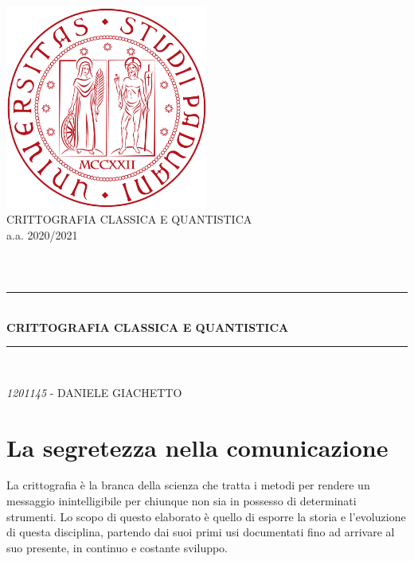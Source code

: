 \documentclass[a4paper, 12pt]{article}
\newcommand{\TITLE}{CRITTOGRAFIA CLASSICA E QUANTISTICA}
\begin{document}
\begin{titlepage}
\begin{center}
\includegraphics[width=0.5\textwidth]{unipd.png}\\

{\large \TITLE{} \\ a.a. 2020/2021}\\[0.5cm]

\begin{tabular}{ll}

\end{tabular}
\\[1.cm]

\rule{\linewidth}{0.5mm} \\[0.4cm]
{ \huge \bfseries \TITLE{} \\[0.4cm] } %

\rule{\linewidth}{0.5mm} \\[1.cm]
\noindent

\vfill
{\large \textit{1201145} - DANIELE GIACHETTO} %
\end{center}
\end{titlepage}

\tableofcontents %
\clearpage %

\pagestyle{fancy}
\section{La segretezza nella comunicazione}
La crittografia è la branca della scienza che tratta i metodi per rendere un messaggio inintelligibile per chiunque non sia in possesso di determinati strumenti.\newline
Lo scopo di questo elaborato è quello di esporre la storia e l'evoluzione di questa disciplina, partendo dai suoi primi usi documentati fino ad arrivare al suo presente, in continuo e costante sviluppo.
\end{document}
